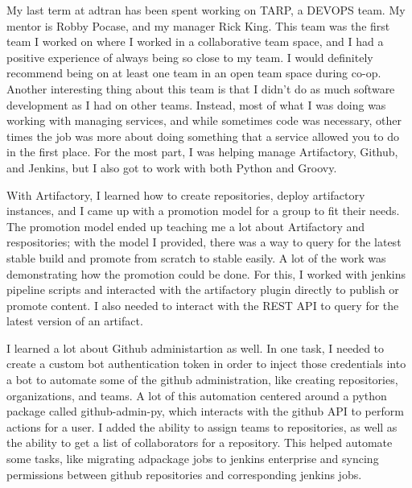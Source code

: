 \documentclass[12pt, letterpaper]{article}
\begin{document}
\par
My last term at adtran has been spent working on TARP, a DEVOPS team. My mentor is Robby Pocase,
and my manager Rick King. This team was the first team I worked on where I worked in a
collaborative team space, and I had a positive experience of always being so close to my team. I
would definitely recommend being on at least one team in an open team space during co-op. Another
interesting thing about this team is that I didn't do as much software development as I had on
other teams. Instead, most of what I was doing was working with managing services, and while
sometimes code was necessary, other times the job was more about doing something that a service
allowed you to do in the first place. For the most part, I was helping manage Artifactory, Github,
and Jenkins, but I also got to work with both Python and Groovy.

\par
With Artifactory, I learned how to create repositories, deploy artifactory instances, and I came up with a promotion model for a group to fit their needs.
The promotion model ended up teaching me a lot about Artifactory and respositories;
with the model I provided, there was a way to query for the latest stable build and promote from scratch to stable easily.
A lot of the work was demonstrating how the promotion could be done. For this, I worked with jenkins pipeline scripts and interacted with the artifactory plugin directly to publish or promote content. I also needed to interact
with the REST API to query for the latest version of an artifact.

\par
I learned a lot about Github administartion as well. In one task, I needed to
create a custom bot authentication token in order to inject those credentials into a bot to automate some of the github administration, like creating repositories, organizations, and teams.
A lot of this automation centered around a python package called github-admin-py,
which interacts with the github API to perform actions for a user. I added the ability
to assign teams to repositories, as well as the ability to get a list of
collaborators for a repository. This helped automate some tasks, like migrating
adpackage jobs to jenkins enterprise and syncing permissions between github
repositories and corresponding jenkins jobs.
\end{document}
